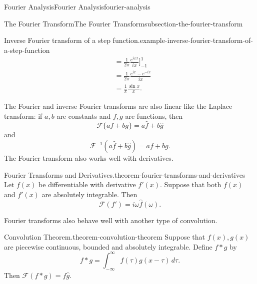 \documentclass[oneside,10pt,]{book}
\numberwithin{equation}{section}
\newcommand{\amp}{&}
\begin{document}
\begin{chapterptx}{Fourier Analysis}{}{Fourier Analysis}{}{}{fourier-analysis}
\begin{sectionptx}{The Fourier Transform}{}{The Fourier Transform}{}{}{subsection-the-fourier-transform}
\begin{example}{Inverse Fourier transform of a step function.}{example-inverse-fourier-transform-of-a-step-function}
\begin{align*}
\amp = \frac{1}{2\pi}\frac{e^{i\omega x}}{ix}\Big]_{-1}^{1} \\
\amp = \frac{1}{2\pi}\frac{e^{ix}-e^{-ix}}{ix} \\
\amp = \frac{1}{\pi}\frac{\sin x}{x}. 
\end{align*}
%
\end{example}
\hypertarget{p-623}{}%
The Fourier and inverse Fourier transforms are also linear like the Laplace transform: if \(a,b\) are constants and \(f,g\) are functions, then%
\begin{equation*}
\mathcal{F}\{af+bg\} = a\hat{f}+b\hat{g}
\end{equation*}
and%
\begin{equation*}
\mathcal{F}^{-1}(a\hat{f}+b\hat{g}) = af + bg.
\end{equation*}
The Fourier transform also works well with derivatives.%
\begin{theorem}{Fourier Transforms and Derivatives.}{}{theorem-fourier-transforms-and-derivatives}%
\hypertarget{p-624}{}%
Let \(f(x)\) be differentiable with derivative \(f'(x)\). Suppose that both \(f(x)\) and \(f'(x)\) are absolutely integrable. Then%
\begin{equation*}
\mathcal{F}(f') = i\omega\hat{f}(\omega).
\end{equation*}
%
\end{theorem}
\hypertarget{p-625}{}%
Fourier transforms also behave well with another type of convolution.%
\begin{theorem}{Convolution Theorem.}{}{theorem-convolution-theorem}%
\hypertarget{p-626}{}%
Suppose that \(f(x),g(x)\) are piecewise continuous, bounded and absolutely integrable. Define \(f\ast g\) by%
\begin{equation*}
f\ast g = \int_{-\infty}^{\infty}f(\tau)g(x-\tau)\,d\tau.
\end{equation*}
Then \(\mathcal{F}(f\ast g) = \hat{f}\hat{g}.\)%
\end{theorem}
\end{sectionptx}
\end{chapterptx}
%
%
\typeout{************************************************}
\typeout{************************************************}
%
\end{document}

